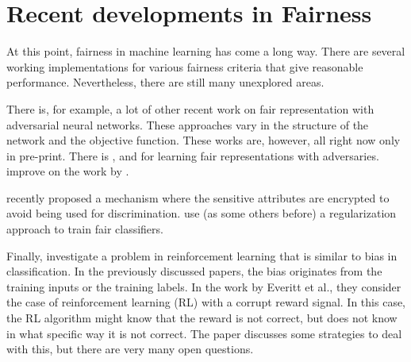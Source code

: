 \section{Recent developments in Fairness}\label{recent-developments-in-fairness}
At this point, fairness in machine learning has come a long way.
There are several working implementations for various fairness criteria
that give reasonable performance.
Nevertheless, there are still many unexplored areas.

There is, for example, a lot of other recent work on fair representation
with adversarial neural networks.
These approaches vary in the structure of the network and the objective function.
These works are, however, all right now only in pre-print.
There is \citet{edwards2015censoring}, \citet{beutel2017data}
and \citet{zhang2018mitigating} for learning fair representations with adversaries.
\citet{calmon2017optimized} improve on the work by \citet{zemel2013learning}.

\citet{kilbertus2018blind} recently proposed a mechanism
where the sensitive attributes are encrypted to avoid being used for discrimination.
\citet{bechavod2017penalizing} use (as some others before) a regularization approach to train fair classifiers.

Finally, \citet{everitt2017reinforcement} investigate
a problem in reinforcement learning that is similar to bias in classification.
In the previously discussed papers,
the bias originates from the training inputs or the training labels.
In the work by Everitt et al.,
they consider the case of reinforcement learning (RL) with a corrupt reward signal.
In this case, the RL algorithm might know that the reward is not correct,
but does not know in what specific way it is not correct.
The paper discusses some strategies to deal with this,
but there are very many open questions.
